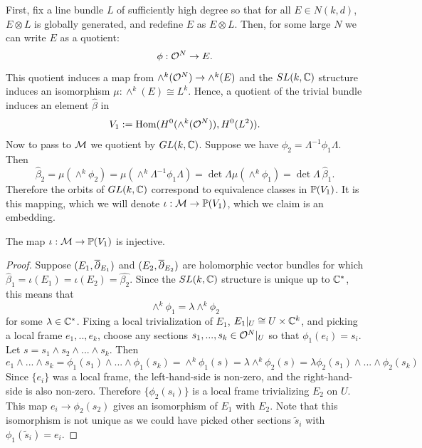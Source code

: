 	First, fix a line bundle $L$ of sufficiently high degree so that for all $E\in N(k,d)$, $E\otimes L$  is globally generated, and redefine $E$ as $E\otimes L$. Then, for some large $N$ we can write $E$ as a quotient:
	\begin{equation}
	\phi:\mathcal{O}^N \to E.
	\end{equation}
	This quotient induces a map from $\wedge^k(\mathcal{O}^N) \to \wedge^k(E)$ and the $SL(k,\mathbb{C})$ structure induces an isomorphism $\mu:\wedge^k(E)\cong L^k$. Hence, a quotient of the trivial bundle induces an element $\hat{\beta}$ in 
	\begin{equation}
	V_1 := \text{Hom}(H^0(\wedge^k(\mathcal{O}^N)), H^0(L^2)).
	\end{equation}
	Now to pass to $\mathcal{M}$ we quotient by $GL(k,\mathbb{C})$. Suppose we have $\phi_2 = \Lambda^{-1} \phi_1 \Lambda$. Then
	\begin{equation}
		\hat{\beta}_2 = \mu(\wedge^k \phi_2) = \mu(\wedge^k \Lambda^{-1}\phi_1 \Lambda) = \det\Lambda \mu(\wedge^k \phi_1) = \det\Lambda~ \hat{\beta}_1.
	\end{equation}
	Therefore the orbits of $GL(k,\mathbb{C})$ correspond to equivalence classes in $\mathbb{P}(V_1)$. It is this mapping, which we will denote $\iota:\mathcal{M}\to \mathbb{P}(V_1)$, which we claim is an embedding. 
	\begin{lemma}
		The map $\iota:\mathcal{M} \to \mathbb{P}(V_1)$ is injective.
	\end{lemma}
	\begin{proof}
		 Suppose $(E_1, \overline{\partial}_{E_1})$ and $(E_2, \overline{\partial}_{E_2})$ are holomorphic vector bundles for which $\hat{\beta}_1 = \iota(E_1) = \iota(E_2) = \hat{\beta_2}$. Since the $SL(k,\mathbb{C})$ structure is unique up to $\mathbb{C}^\ast$, this means that
		\begin{equation}
		\wedge^k \phi_1 = \lambda \wedge^k \phi_2
		\end{equation}
		for some $\lambda \in \mathbb{C}^\ast$. Fixing a local trivialization of $E_1$, $E_1|_U \cong U\times \mathbb{C}^k$, and picking a local frame $e_1,..,e_k$, choose any sections $s_1,...,s_k \in \mathcal{O}^N|_{U}$ so that $\phi_1(e_i) = s_i$. Let $s = s_1 \wedge s_2 \wedge ... \wedge s_k$. Then
		\begin{equation}
		e_1\wedge...\wedge s_k=\phi_1(s_1)\wedge...\wedge \phi_1(s_k)= \wedge^k \phi_1(s) = \lambda \wedge^k \phi_2(s) = \lambda \phi_2(s_1)\wedge...\wedge \phi_2(s_k)
		\end{equation}
		Since $\{e_i\}$ was a local frame, the left-hand-side is non-zero, and the right-hand-side is also non-zero. Therefore $\{\phi_2(s_i)\}$ is a local frame trivializing $E_2$ on $U$. This map $e_i \to \phi_2(s_2)$ gives an isomorphism of $E_1$ with $E_2$. Note that this isomorphism is not unique as we could have picked other sections $\tilde{s}_i$ with $\phi_1(\tilde{s}_i) = e_i$.
	\end{proof}
